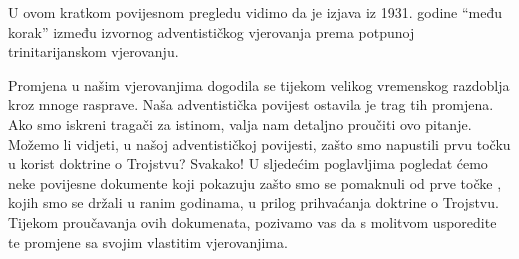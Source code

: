 U ovom kratkom povijesnom pregledu vidimo da je izjava iz 1931. godine “među korak” između izvornog adventističkog vjerovanja prema potpunoj trinitarijanskom vjerovanju.

Promjena u našim vjerovanjima dogodila se tijekom velikog vremenskog razdoblja kroz mnoge rasprave. Naša adventistička povijest ostavila je trag tih promjena. Ako smo iskreni tragači za istinom, valja nam detaljno proučiti ovo pitanje. Možemo li vidjeti, u našoj adventističkoj povijesti, zašto smo napustili prvu točku  u korist doktrine o Trojstvu? Svakako! U sljedećim poglavljima pogledat ćemo neke povijesne dokumente koji pokazuju zašto smo se pomaknuli od prve točke , kojih smo se držali u ranim godinama, u prilog prihvaćanja doktrine o Trojstvu. Tijekom proučavanja ovih dokumenata, pozivamo vas da s molitvom usporedite te promjene sa svojim vlastitim vjerovanjima.
